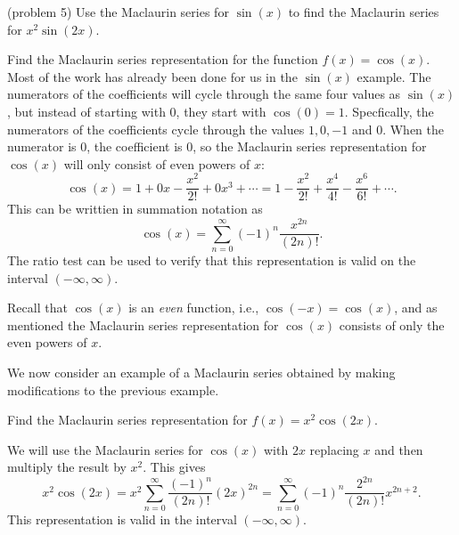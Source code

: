 \documentclass{ximera}
\begin{document}
\begin{problem}(problem 5)
Use the Maclaurin series for $\sin(x)$ to find the Maclaurin series for $x^2 \sin(2x)$.
\begin{multipleChoice}
\end{multipleChoice}
\end{problem}

\begin{example} 
Find the Maclaurin series representation for the function $f(x) = \cos(x)$.\\
Most of the work has already been done for us in the $\sin(x)$ example.  The numerators of the coefficients will cycle through the same
four values as $\sin(x)$, but instead of starting with 0, they start with $\cos(0) = 1$. 
Specfically, the numerators of the coefficients cycle through the values $1, 0, -1$ and $0$.  When the numerator is 0, the coefficient is 0,
so the Maclaurin series representation for $\cos(x)$ will only consist of even powers of $x$:
\[
\cos(x) = 1 + 0x - \frac{x^2}{2!} + 0x^3 + \cdots = 1 - \frac{x^2}{2!} + \frac{x^4}{4!} - \frac{x^6}{6!} + \cdots.
\]
This can be writtien in summation notation as
\[
\cos(x) = \sum_{n=0}^\infty (-1)^n \frac{x^{2n}}{(2n)!}.
\]
The ratio test can be used to verify that this representation is valid on the interval $(-\infty, \infty)$.
\begin{remark}
Recall that $\cos(x)$ is an \textit{even} function, 
i.e., $\cos(-x) = \cos(x)$, and as mentioned the Maclaurin series representation for $\cos(x)$ consists of only the 
even powers of $x$.
\end{remark} 
\end{example}


We now consider an example of a Maclaurin series obtained by making modifications to the previous example.

\begin{example}[example 7]
Find the Maclaurin series representation for $f(x) = x^2\cos(2x).$

We will use the Maclaurin series for $\cos(x)$ with $2x$ replacing $x$ and then multiply the result by $x^2$.
This gives
\[
x^2\cos(2x) = x^2\sum_{n=0}^\infty \frac{(-1)^n}{(2n)!}(2x)^{2n} = \sum_{n=0}^\infty (-1)^n\frac{2^{2n}}{(2n)!}x^{2n+2}.
\]
This representation is valid in the interval $(-\infty, \infty)$.
\end{example}
\end{document}
